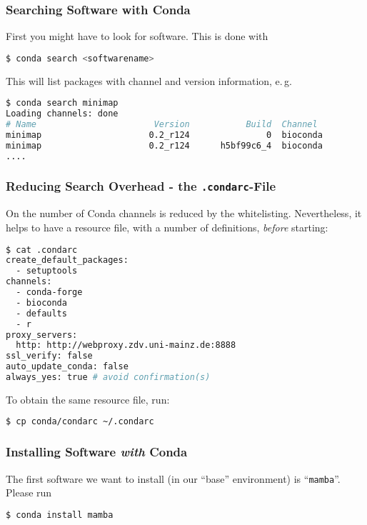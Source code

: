 \begin{frame}[fragile]
  \frametitle{Searching Software with Conda}
  First you might have to look for software. This is done with
  \begin{lstlisting}[language=Bash, style=Shell]
$ conda search <softwarename>
  \end{lstlisting}
  \pause
  \pause
  This will list packages with channel and version information, e.\,g.
  \begin{lstlisting}[language=Bash, style=Shell, basicstyle=\tiny]
$ conda search minimap
Loading channels: done
# Name                       Version           Build  Channel             
minimap                     0.2_r124               0  bioconda            
minimap                     0.2_r124      h5bf99c6_4  bioconda
....
  \end{lstlisting}
\end{frame}

\begin{frame}[fragile]
  \frametitle{Reducing Search Overhead - the \texttt{.condarc}-File}
  On \mogon{} the number of Conda channels is reduced by the whitelisting. Nevertheless, it helps to have a resource file, with a number of definitions, \emph{before} starting:
  \begin{lstlisting}[language=Bash, style=Shell]
$ cat .condarc
create_default_packages:
  - setuptools
channels:
  - conda-forge
  - bioconda
  - defaults
  - r
proxy_servers:
  http: http://webproxy.zdv.uni-mainz.de:8888
ssl_verify: false
auto_update_conda: false
always_yes: true # avoid confirmation(s)
  \end{lstlisting}
  To obtain the same resource file, run:
  \begin{lstlisting}[language=Bash, style=Shell]
$ cp conda/condarc ~/.condarc
  \end{lstlisting}
\end{frame}

\begin{frame}[fragile]
  \frametitle{Installing Software \emph{with} Conda}
  The first software we want to install (in our ``base'' environment) is ``\texttt{mamba}''.  
  Please run
  \begin{lstlisting}[language=Bash, style=Shell]
$ conda install mamba
  \end{lstlisting}
\end{frame}

